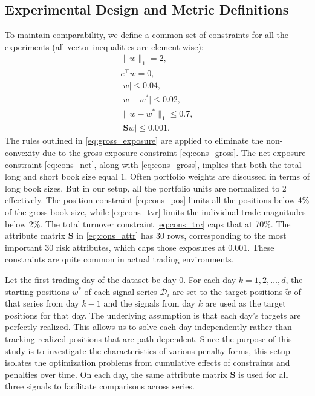 \documentclass[11pt, letterpaper]{article}
\begin{document}
\subsection{Experimental Design and Metric Definitions}
To maintain comparability, we define a common set of constraints for all the experiments (all vector inequalities are
element-wise):
\begin{subequations}
\begin{gather}
  \lVert w\rVert_1 = 2,\label{eq:cons_gross} \\
  e^\top w = 0, \label{eq:cons_net} \\
  \lvert w\rvert \leq 0.04, \label{eq:cons_pos} \\
  \lvert w - w^*\rvert \leq 0.02, \label{eq:cons_tvr} \\
  \lVert w - w^*\rVert_1 \leq 0.7, \label{eq:cons_trc} \\
  \lvert \mathbf{S}w\rvert \leq 0.001.\label{eq:cons_attr}
\end{gather}
\end{subequations}
The rules outlined in \eqref{eq:gross_exposure} are applied to eliminate the non-convexity due to the gross exposure constraint
\eqref{eq:cons_gross}. The net exposure constraint \eqref{eq:cons_net}, along with \eqref{eq:cons_gross}, implies that both the
total long and short book size equal $1$. Often portfolio weights are discussed in terms of long book sizes. But in our setup,
all the portfolio units are normalized to 2 effectively. The position constraint \eqref{eq:cons_pos} limits all the positions
below 4\% of the gross book size, while \eqref{eq:cons_tvr} limits the individual trade magnitudes below 2\%. The total turnover
constraint \eqref{eq:cons_trc} caps that at 70\%. The attribute matrix $\mathbf{S}$ in \eqref{eq:cons_attr} has 30 rows,
corresponding to the most important 30 risk attributes, which caps those exposures at 0.001. These constraints are quite common
in actual trading environments.

Let the first trading day of the dataset be day 0. For each day $k=1, 2, \dots, d$, the starting positions $w^*$ of each signal
series $\mathcal{D}_i$ are set to the target positions $\tilde{w}$ of that series from day $k-1$ and the signals from day $k$
are used as the target positions for that day. The underlying assumption is that each day's targets are perfectly realized. This
allows us to solve each day independently rather than tracking realized positions that are path-dependent. Since the purpose of
this study is to investigate the characteristics of various penalty forms, this setup isolates the optimization problems from
cumulative effects of constraints and penalties over time. On each day, the same attribute matrix $\mathbf{S}$ is used for all
three signals to facilitate comparisons across series.
\end{document}
